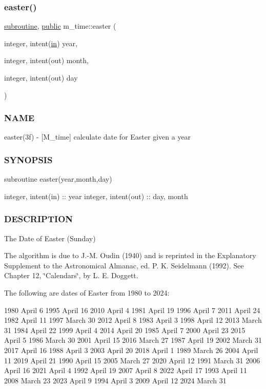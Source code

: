 \subsubsection{\texorpdfstring{easter()}{easter()}}
{\footnotesize\ttfamily \hyperlink{M__stopwatch_83_8txt_acfbcff50169d691ff02d4a123ed70482}{subroutine}, \hyperlink{M__stopwatch_83_8txt_a2f74811300c361e53b430611a7d1769f}{public} m\+\_\+time\+::easter (\begin{DoxyParamCaption}\item[{integer, intent(\hyperlink{M__journal_83_8txt_afce72651d1eed785a2132bee863b2f38}{in})}]{year,  }\item[{integer, intent(out)}]{month,  }\item[{integer, intent(out)}]{day }\end{DoxyParamCaption})}



\subsubsection*{N\+A\+ME}

easter(3f) -\/ \mbox{[}M\+\_\+time\mbox{]} calculate date for Easter given a year 

\subsubsection*{S\+Y\+N\+O\+P\+S\+IS}

subroutine easter(year,month,day)

integer, intent(in) \+:\+: year integer, intent(out) \+:\+: day, month

\subsubsection*{D\+E\+S\+C\+R\+I\+P\+T\+I\+ON}

The Date of Easter (Sunday)

The algorithm is due to J.-\/M. Oudin (1940) and is reprinted in the Explanatory Supplement to the Astronomical Almanac, ed. P. K. Seidelmann (1992). See Chapter 12, \char`\"{}\+Calendars\char`\"{}, by L. E. Doggett.

The following are dates of Easter from 1980 to 2024\+:

1980 April 6 1995 April 16 2010 April 4 1981 April 19 1996 April 7 2011 April 24 1982 April 11 1997 March 30 2012 April 8 1983 April 3 1998 April 12 2013 March 31 1984 April 22 1999 April 4 2014 April 20 1985 April 7 2000 April 23 2015 April 5 1986 March 30 2001 April 15 2016 March 27 1987 April 19 2002 March 31 2017 April 16 1988 April 3 2003 April 20 2018 April 1 1989 March 26 2004 April 11 2019 April 21 1990 April 15 2005 March 27 2020 April 12 1991 March 31 2006 April 16 2021 April 4 1992 April 19 2007 April 8 2022 April 17 1993 April 11 2008 March 23 2023 April 9 1994 April 3 2009 April 12 2024 March 31

